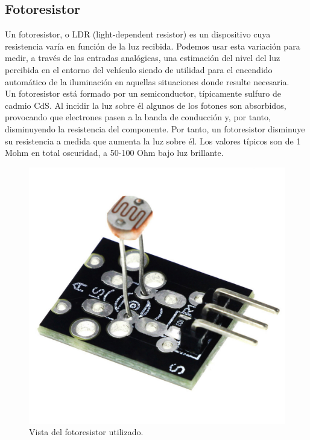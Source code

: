 \subsection{Fotoresistor}

Un fotoresistor, o LDR (light-dependent resistor) es un dispositivo cuya resistencia varía en función de la luz recibida. Podemos usar esta variación para medir, a través de 
las entradas analógicas, una estimación del nivel del luz percibida en el entorno del vehículo siendo de utilidad para el encendido automático de la iluminación en aquellas situaciones 
donde resulte necesaria.\\

Un fotoresistor está formado por un semiconductor, típicamente sulfuro de cadmio CdS. Al incidir la luz sobre él algunos de los fotones son absorbidos, provocando que electrones pasen
a la banda de conducción y, por tanto, disminuyendo la resistencia del componente. Por tanto, un fotoresistor disminuye su resistencia a medida que aumenta la luz sobre él.
Los valores típicos son de 1 Mohm en total oscuridad, a 50-100 Ohm bajo luz brillante.\\


\begin{figure}[H]
  \begin{center}
    \includegraphics[scale=0.05]{imagenes/fotoresistor_utilizado.jpg}
  \end{center}
  \caption{Vista del fotoresistor utilizado.}
  \label{figura:micro_amplificacion}
\end{figure}


